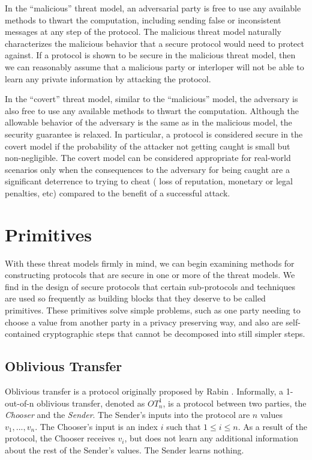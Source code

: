In the {}``malicious'' threat model, an adversarial party is free
to use any available methods to thwart the computation, including
sending false or inconsistent messages at any step of the protocol.
The malicious threat model naturally characterizes the malicious behavior
that a secure protocol would need to protect against. If a protocol
is shown to be secure in the malicious threat model, then we can reasonably
assume that a malicious party or interloper will not be able to learn
any private information by attacking the protocol.

In the {}``covert'' threat model, similar to the {}``malicious''
model, the adversary is also free to use any available methods to
thwart the computation. Although the allowable behavior of the adversary
is the same as in the malicious model, the security guarantee is relaxed.
In particular, a protocol is considered secure in the covert model
if the probability of the attacker not getting caught is small but
non-negligible. The covert model can be considered appropriate for
real-world scenarios only when the consequences to the adversary for
being caught are a significant deterrence to trying to cheat (\ie
loss of reputation, monetary or legal penalties, etc) compared to
the benefit of a successful attack. \cite{aumannlindell}


\section{Primitives \label{sub:Primitives}}

With these threat models firmly in mind, we can begin examining methods
for constructing protocols that are secure in one or more of the threat
models. We find in the design of secure protocols that certain sub-protocols
and techniques are used so frequently as building blocks that they
deserve to be called primitives. These primitives solve simple problems,
such as one party needing to choose a value from another party in
a privacy preserving way, and also are self-contained cryptographic
steps that cannot be decomposed into still simpler steps.


\subsection{Oblivious Transfer \label{sub:Oblivious-Transfer}}

Oblivious transfer is a protocol originally proposed by Rabin \cite{Rabin81}.
Informally, a 1-out-of-n oblivious transfer, denoted as $OT_{n}^{1}$,
is a protocol between two parties, the \emph{Chooser} and the \emph{Sender}.
The Sender's inputs into the protocol are $n$ values $v_{1},...,v_{n}$.
The Chooser's input is an index $i$ such that $1\le i\le n$. As
a result of the protocol, the Chooser receives $v_{i}$, but does
not learn any additional information about the rest of the Sender's
values. The Sender learns nothing.

